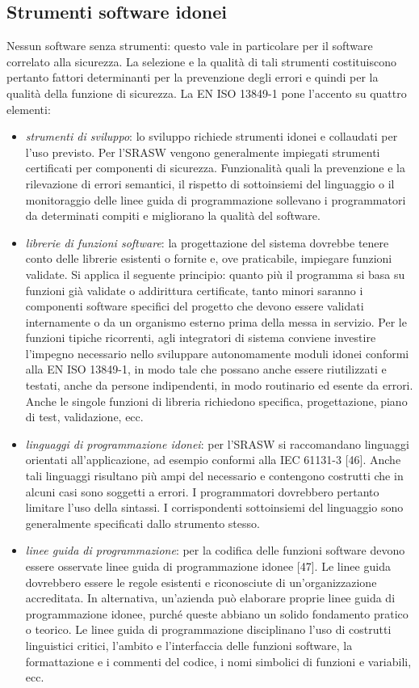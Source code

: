 \subsection{Strumenti software idonei}
\label{subsec:06-3-7}
Nessun software senza strumenti: questo vale in particolare per il software correlato alla sicurezza. La selezione e la qualità di tali strumenti costituiscono pertanto fattori determinanti per la prevenzione degli errori e quindi per la qualità della funzione di sicurezza. La EN ISO 13849-1 pone l'accento su quattro elementi:
\begin{itemize}
    \item \textit{strumenti di sviluppo}: lo sviluppo richiede strumenti idonei e collaudati per l'uso previsto. Per l'SRASW vengono generalmente impiegati strumenti certificati per componenti di sicurezza. Funzionalità quali la prevenzione e la rilevazione di errori semantici, il rispetto di sottoinsiemi del linguaggio o il monitoraggio delle linee guida di programmazione sollevano i programmatori da determinati compiti e migliorano la qualità del software.
    \item \textit{librerie di funzioni software}: la progettazione del sistema dovrebbe tenere conto delle librerie esistenti o fornite e, ove praticabile, impiegare funzioni validate. Si applica il seguente principio: quanto più il programma si basa su funzioni già validate o addirittura certificate, tanto minori saranno i componenti software specifici del progetto che devono essere validati internamente o da un organismo esterno prima della messa in servizio. Per le funzioni tipiche ricorrenti, agli integratori di sistema conviene investire l'impegno necessario nello sviluppare autonomamente moduli idonei conformi alla EN ISO 13849-1, in modo tale che possano anche essere riutilizzati e testati, anche da persone indipendenti, in modo routinario ed esente da errori. Anche le singole funzioni di libreria richiedono specifica, progettazione, piano di test, validazione, ecc.
    \item \textit{linguaggi di programmazione idonei}: per l'SRASW si raccomandano linguaggi orientati all'applicazione, ad esempio conformi alla IEC 61131-3 [46]. Anche tali linguaggi risultano più ampi del necessario e contengono costrutti che in alcuni casi sono soggetti a errori. I programmatori dovrebbero pertanto limitare l'uso della sintassi. I corrispondenti sottoinsiemi del linguaggio sono generalmente specificati dallo strumento stesso.
    \item \textit{linee guida di programmazione}: per la codifica delle funzioni software devono essere osservate linee guida di programmazione idonee [47]. Le linee guida dovrebbero essere le regole esistenti e riconosciute di un'organizzazione accreditata. In alternativa, un'azienda può elaborare proprie linee guida di programmazione idonee, purché queste abbiano un solido fondamento pratico o teorico. Le linee guida di programmazione disciplinano l'uso di costrutti linguistici critici, l'ambito e l'interfaccia delle funzioni software, la formattazione e i commenti del codice, i nomi simbolici di funzioni e variabili, ecc.
\end{itemize}

